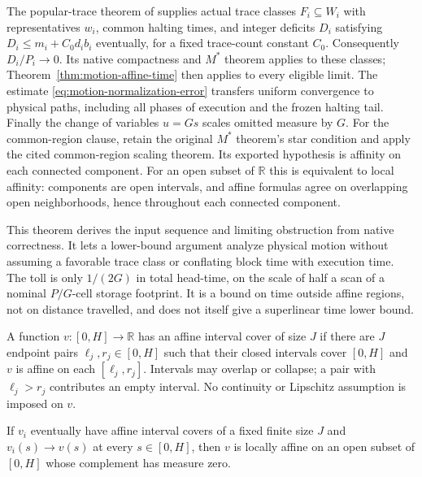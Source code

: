 \begin{proofoutline}
The popular-trace theorem of \cite{FirstPaper2026} supplies actual trace
classes $F_i\subseteq W_i$ with representatives $w_i$, common halting times,
and integer deficits $D_i$ satisfying
$D_i\le m_i+C_0d_i b_i$ eventually, for a fixed trace-count constant $C_0$.
Consequently $D_i/P_i\to0$.  Its native compactness and $M^*$ theorem applies
to these classes; Theorem~\ref{thm:motion-affine-time} then applies to every
eligible limit.  The estimate \eqref{eq:motion-normalization-error} transfers
uniform convergence to physical paths, including all phases of execution
and the frozen halting tail.  Finally the change of variables $u=Gs$ scales
omitted measure by $G$.  For the common-region clause, retain the original
$M^*$ theorem's star condition and apply the cited common-region scaling
theorem.  Its exported hypothesis is affinity on each connected component.
For an open subset of $\mathbb R$ this is equivalent to local affinity:
components are open intervals, and affine formulas agree on overlapping
open neighborhoods, hence throughout each connected component.
\end{proofoutline}

This theorem derives the input sequence and limiting obstruction from native
correctness.  It lets a lower-bound argument analyze physical motion without
assuming a favorable trace class or conflating block time with execution time.
The toll is only $1/(2G)$ in total head-time, on the scale of half a scan of
a nominal $P/G$-cell storage footprint.  It is a bound on time outside affine
regions, not on distance travelled, and does not itself give a superlinear
time lower bound.

\begin{definition}
\label{def:motion-affine-cover}
A function $v:[0,H]\to\mathbb R$ has an affine interval cover of size $J$ if
there are $J$ endpoint pairs $\ell_j,r_j\in[0,H]$ such that their closed
intervals cover $[0,H]$ and $v$ is affine on each $[\ell_j,r_j]$.
Intervals may overlap or collapse; a pair with $\ell_j>r_j$ contributes an
empty interval.  No continuity or Lipschitz assumption is imposed on $v$.
\end{definition}

\begin{lemma}
\label{lem:motion-cover-closure}
If $v_i$ eventually have affine interval covers of a fixed finite size $J$
and $v_i(s)\to v(s)$ at every $s\in[0,H]$, then $v$ is locally affine on an
open subset of $[0,H]$ whose complement has measure zero.
\end{lemma}

